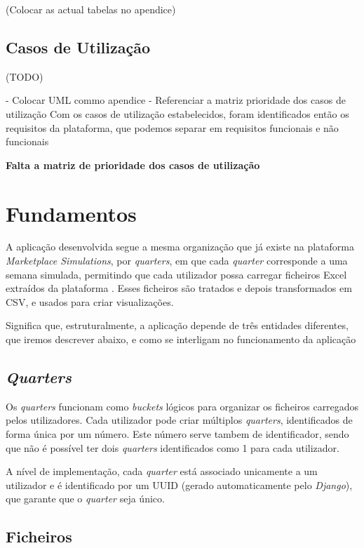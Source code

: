 (Colocar as actual tabelas no apendice)


\subsection{Casos de Utilização}
(TODO)

- Colocar UML commo apendice
- Referenciar a matriz prioridade dos casos de utilização
Com os casos de utilização estabelecidos, foram identificados então os requisitos da plataforma, que podemos separar em requisitos funcionais e não funcionais

\textbf{ Falta a matriz de prioridade dos casos de utilização}

\section{Fundamentos}
\label{sec:fundamentos}

A aplicação desenvolvida segue a mesma organização que já existe na plataforma \textit{Marketplace Simulations}, por \textit{quarters}, em que cada \textit{quarter} corresponde a uma semana simulada, permitindo que cada utilizador possa carregar ficheiros Excel extraídos da plataforma . Esses ficheiros são tratados e depois transformados em CSV, e usados para criar visualizações. 

Significa que, estruturalmente, a aplicação depende de três entidades diferentes, que iremos descrever abaixo, e como se interligam no funcionamento da aplicação

\subsection{\textit{Quarters}}
Os \textit{quarters} funcionam como \textit{buckets} lógicos para organizar os ficheiros carregados pelos utilizadores. Cada utilizador pode criar múltiplos \textit{quarters}, identificados de forma única por um número. Este número serve tambem de identificador, sendo que não é possível ter dois \textit{quarters} identificados como 1 para cada utilizador.

A nível de implementação, cada \textit{quarter} está associado unicamente a um utilizador e é identificado por um UUID (gerado automaticamente pelo \textit{Django}), que garante que o \textit{quarter} seja único.

\subsection{Ficheiros}

